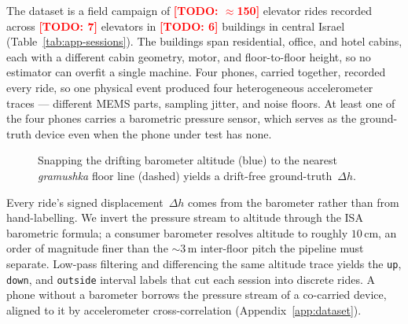 \documentclass[manuscript,review,screen]{acmart}
\newcommand{\todo}[1]{\textcolor{red}{\textbf{[TODO: #1]}}}
\begin{document}
The dataset is a field campaign of \todo{$\approx$150} elevator
rides recorded across \todo{7} elevators in \todo{6} buildings in
central Israel (Table~\ref{tab:app-sessions}).  The buildings span
residential, office, and hotel cabins, each with a different cabin
geometry, motor, and floor-to-floor height, so no estimator can
overfit a single machine.  Four phones, carried together, recorded
every ride, so one physical event produced four heterogeneous
accelerometer traces --- different MEMS parts, sampling jitter, and
noise floors.  At least one of the four phones carries a barometric
pressure sensor, which serves as the ground-truth device even when
the phone under test has none.

\begin{figure}
  \vspace{-0.7em}
  \centering
  \caption{Snapping the drifting barometer altitude (blue) to the
    nearest \emph{gramushka} floor line (dashed) yields a drift-free
    ground-truth~$\Delta h$.}
  \label{fig:gt-snap}
  \vspace{-0.6em}
\end{figure}

Every ride's signed displacement~$\Delta h$ comes from the barometer
rather than from hand-labelling.  We invert the pressure stream to
altitude through the ISA barometric formula; a consumer barometer
resolves altitude to roughly $10$\,cm, an order of magnitude finer
than the $\sim\!3$\,m inter-floor pitch the pipeline must separate.
Low-pass filtering and differencing the same altitude trace yields
the \texttt{up}, \texttt{down}, and \texttt{outside} interval labels
that cut each session into discrete rides.  A phone without a
barometer borrows the pressure stream of a co-carried device,
aligned to it by accelerometer cross-correlation
(Appendix~\ref{app:dataset}).
\end{document}
